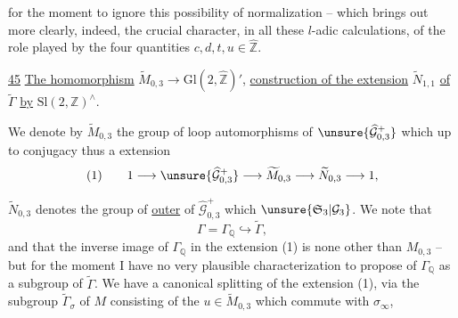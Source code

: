 
for the moment to ignore this possibility of normalization -- which brings out more clearly, indeed, the crucial character, in all these $l$-adic calculations, of the role played by the four quantities $c,d,t,u\in\widehat{\mathbb Z}$.


\uline{45} \uline{The homomorphism} $\widetilde M_{0,3}\longrightarrow\mathrm{Gl}(2,\widehat{\mathbb Z})'$, \uline{construction of the extension}  $\widetilde N_{1,1}$ \uline{of} $\widetilde\Gamma$ \uline{by} $\mathrm{Sl}(2,\mathbb Z)^\wedge$.

We denote by $\widetilde M_{0,3}$ the group of  loop automorphisms of $\unsure{\widehat{\mathcal G}_{0,3}^{+}}$ which   up to conjugacy   thus a  extension
\[
(1)\qquad 1\longrightarrow\unsure{\widehat{\mathcal G}_{0,3}^{+}}\longrightarrow\widetilde M_{0,3}\longrightarrow\widetilde N_{0,3}\longrightarrow 1,
\]

$\widetilde N_{0,3}$ denotes the group of \uline{outer}  of $\widehat{\mathcal G}_{0,3}^{+}$ which   $\unsure{\mathfrak S_3|\mathcal G_3}$. We note that
\[
\Gamma=\Gamma_{\mathbb Q}\hookrightarrow\widetilde\Gamma,
\]
and that the inverse image of $\Gamma_{\mathbb Q}$ in the extension (1) is none other than $M_{0,3}$ -- but for the moment I have no very plausible characterization to propose of $\Gamma_{\mathbb Q}$ as a subgroup of $\widetilde\Gamma$. We have a canonical splitting of the extension (1), via the subgroup $\widetilde\Gamma_{\sigma}$ of $M$ consisting of the  $u\in\widetilde M_{0,3}$ which commute with $\sigma_\infty$,



